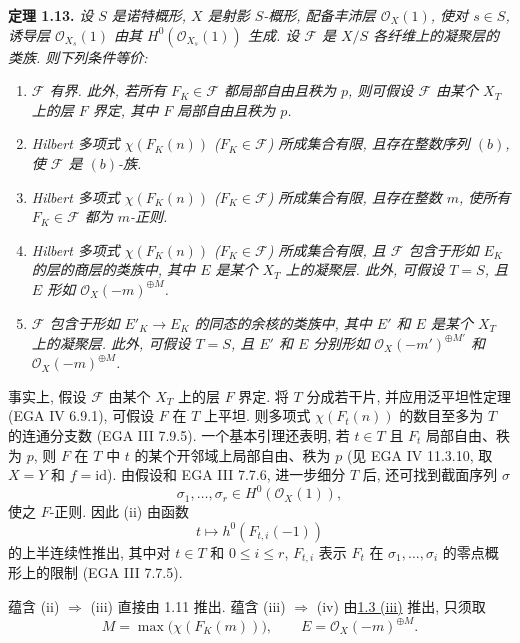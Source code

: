 \textbf{定理 1.13.} \emph{设 \(S\) 是诺特概形, \(X\) 是射影 \(S\)-概形, 配备丰沛层 \(\mathcal O_X(1)\), 使对 \(s\in S\), 诱导层 \(\mathcal O_{X_s}(1)\) 由其 \(H^0(\mathcal O_{X_s}(1))\) 生成. 设 \(\mathcal F\) 是 \(X/S\) 各纤维上的凝聚层的类族. 则下列条件等价:}
\begin{enumerate}[label=(\roman*)]
\item \emph{\(\mathcal F\) 有界. 此外, 若所有 \(F_K\in\mathcal F\) 都局部自由且秩为 \(p\), 则可假设 \(\mathcal F\) 由某个 \(X_T\) 上的层 \(F\) 界定, 其中 \(F\) 局部自由且秩为 \(p\).}
\item \emph{Hilbert 多项式 \(\chi(F_K(n))\) (\(F_K\in\mathcal F\)) 所成集合有限, 且存在整数序列 \((b)\), 使 \(\mathcal F\) 是 \((b)\)-族.}
\item \emph{Hilbert 多项式 \(\chi(F_K(n))\) (\(F_K\in\mathcal F\)) 所成集合有限, 且存在整数 \(m\), 使所有 \(F_K\in\mathcal F\) 都为 \(m\)-正则.}
\item \emph{Hilbert 多项式 \(\chi(F_K(n))\) (\(F_K\in\mathcal F\)) 所成集合有限, 且 \(\mathcal F\) 包含于形如 \(E_K\) 的层的商层的类族中, 其中 \(E\) 是某个 \(X_T\) 上的凝聚层. 此外, 可假设 \(T=S\), 且 \(E\) 形如 \(\mathcal O_X(-m)^{\oplus M}\).}
\item \emph{\(\mathcal F\) 包含于形如 \(E'_K\to E_K\) 的同态的余核的类族中, 其中 \(E'\) 和 \(E\) 是某个 \(X_T\) 上的凝聚层. 此外, 可假设 \(T=S\), 且 \(E'\) 和 \(E\) 分别形如 \(\mathcal O_X(-m')^{\oplus M'}\) 和 \(\mathcal O_X(-m)^{\oplus M}\).}
\end{enumerate}

事实上, 假设 \(\mathcal F\) 由某个 \(X_T\) 上的层 \(F\) 界定. 将 \(T\) 分成若干片, 并应用泛平坦性定理 (EGA IV 6.9.1), 可假设 \(F\) 在 \(T\) 上平坦. 则多项式 \(\chi(F_t(n))\) 的数目至多为 \(T\) 的连通分支数 (EGA III 7.9.5). 一个基本引理还表明, 若 \(t\in T\) 且 \(F_t\) 局部自由、秩为 \(p\), 则 \(F\) 在 \(T\) 中 \(t\) 的某个开邻域上局部自由、秩为 \(p\) (见 EGA IV 11.3.10, 取 \(X=Y\) 和 \(f=\mathrm{id}\)). 由假设和 EGA III 7.7.6, 进一步细分 \(T\) 后, 还可找到截面序列 \(\sigma\)
\[
\sigma_1,\ldots,\sigma_r\in H^0(\mathcal O_X(1)),
\]
使之 \(F\)-正则. 因此 (ii) 由函数
\[
t\longmapsto h^0(F_{t,i}(-1))
\]
的上半连续性推出, 其中对 \(t\in T\) 和 \(0\le i\le r\), \(F_{t,i}\) 表示 \(F_t\) 在 \(\sigma_1,\ldots,\sigma_i\) 的零点概形上的限制 (EGA III 7.7.5).

蕴含 (ii) \(\Rightarrow\) (iii) 直接由 1.11 推出. 蕴含 (iii) \(\Rightarrow\) (iv) 由\hyperlink{sga6.e13.prop.1-3}{1.3 (iii)} 推出, 只须取
\[
M=\max\bigl(\chi(F_K(m))\bigr),
\qquad E=\mathcal O_X(-m)^{\oplus M}.
\]

